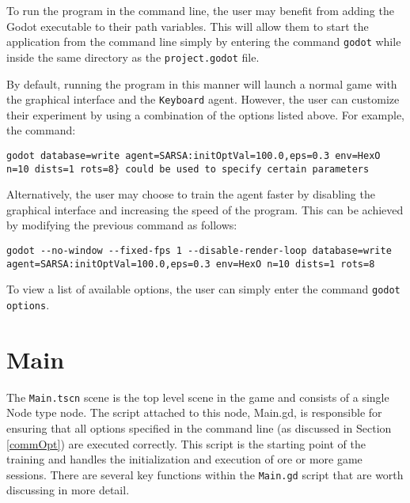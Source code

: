 To run the program in the command line, the user may benefit from adding the Godot executable to their path variables. This will allow them to start the application from the command line simply by entering the command \texttt{godot} while inside the same directory as the \texttt{project.godot} file.

By default, running the program in this manner will launch a normal game with the graphical interface and the \texttt{Keyboard} agent. However, the user can customize their experiment by using a combination of the options listed above. For example, the command:
\begin{lstlisting}
godot database=write agent=SARSA:initOptVal=100.0,eps=0.3 env=HexO n=10 dists=1 rots=8} could be used to specify certain parameters
\end{lstlisting}

Alternatively, the user may choose to train the agent faster by disabling the graphical interface and increasing the speed of the program. This can be achieved by modifying the previous command as follows:

\begin{lstlisting}
godot --no-window --fixed-fps 1 --disable-render-loop database=write agent=SARSA:initOptVal=100.0,eps=0.3 env=HexO n=10 dists=1 rots=8
\end{lstlisting}

To view a list of available options, the user can simply enter the command \texttt{godot options}.

\section{Main}
The \texttt{Main.tscn} scene is the top level scene in the game and consists of a single Node type node. The script attached to this node, Main.gd, is responsible for ensuring that all options specified in the command line (as discussed in Section \ref{commOpt}) are executed correctly. This script is the starting point of the training and handles the initialization and execution of ore or more game sessions.
There are several key functions within the \texttt{Main.gd} script that are worth discussing in more detail.

